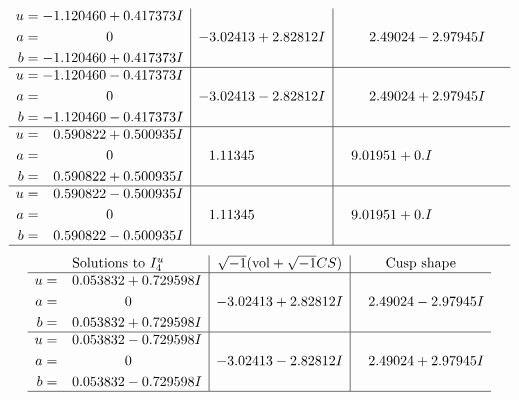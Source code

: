 \documentclass[1p]{elsarticle_modified}
\theoremstyle{definition}
\newcommand{\I}{\sqrt{-1}}
\begin{document}
$$\begin{array}{c|c|c}
\begin{aligned}
u &= -1.120460 + 0.417373 I \\
a &= \phantom{-0.000000 } 0 \\
b &= -1.120460 + 0.417373 I\end{aligned}
 & -3.02413 + 2.82812 I & \phantom{-}2.49024 - 2.97945 I \\ \hline\begin{aligned}
u &= -1.120460 - 0.417373 I \\
a &= \phantom{-0.000000 } 0 \\
b &= -1.120460 - 0.417373 I\end{aligned}
 & -3.02413 - 2.82812 I & \phantom{-}2.49024 + 2.97945 I \\ \hline\begin{aligned}
u &= \phantom{-}0.590822 + 0.500935 I \\
a &= \phantom{-0.000000 } 0 \\
b &= \phantom{-}0.590822 + 0.500935 I\end{aligned}
 & \phantom{-}1.11345\phantom{ +0.000000I} & \phantom{-}9.01951 + 0. I\phantom{ +0.000000I} \\ \hline\begin{aligned}
u &= \phantom{-}0.590822 - 0.500935 I \\
a &= \phantom{-0.000000 } 0 \\
b &= \phantom{-}0.590822 - 0.500935 I\end{aligned}
 & \phantom{-}1.11345\phantom{ +0.000000I} & \phantom{-}9.01951 + 0. I\phantom{ +0.000000I}\\
 \hline 
 \end{array}$$\newpage$$\begin{array}{c|c|c}  
\text{Solutions to }I^u_{4}& \I (\text{vol} + \sqrt{-1}CS) & \text{Cusp shape}\\
 \hline 
\begin{aligned}
u &= \phantom{-}0.053832 + 0.729598 I \\
a &= \phantom{-0.000000 } 0 \\
b &= \phantom{-}0.053832 + 0.729598 I\end{aligned}
 & -3.02413 + 2.82812 I & \phantom{-}2.49024 - 2.97945 I \\ \hline\begin{aligned}
u &= \phantom{-}0.053832 - 0.729598 I \\
a &= \phantom{-0.000000 } 0 \\
b &= \phantom{-}0.053832 - 0.729598 I\end{aligned}
 & -3.02413 - 2.82812 I & \phantom{-}2.49024 + 2.97945 I\\
 \hline 
 \end{array}$$\newpage\newpage\renewcommand{\arraystretch}{1}
\end{document}
